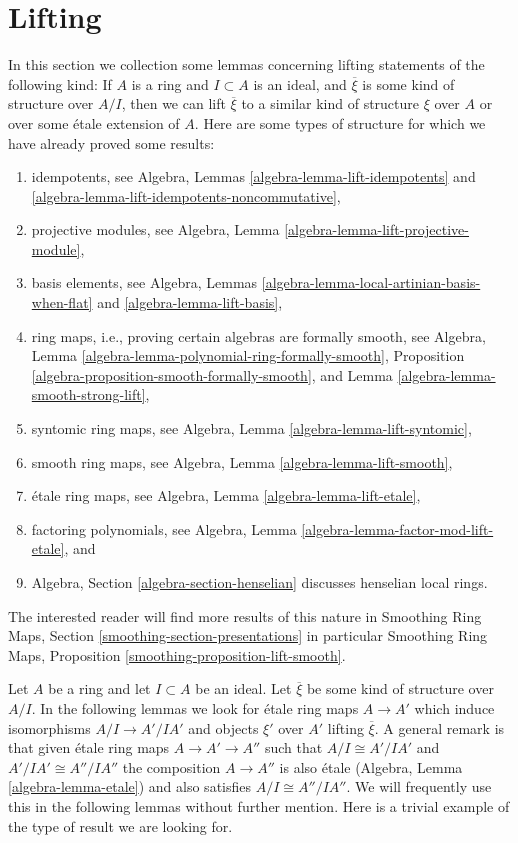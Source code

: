 \section{Lifting}
\label{section-lifting}

\noindent
In this section we collection some lemmas concerning lifting
statements of the following kind: If $A$ is a ring and $I \subset A$
is an ideal, and $\overline{\xi}$ is some kind of structure over
$A/I$, then we can lift $\overline{\xi}$ to a similar kind of structure
$\xi$ over $A$ or over some \'etale extension of $A$. Here are some types
of structure for which we have already proved some results:
\begin{enumerate}
\item idempotents, see
Algebra, Lemmas \ref{algebra-lemma-lift-idempotents} and
\ref{algebra-lemma-lift-idempotents-noncommutative},
\item projective modules, see
Algebra, Lemma \ref{algebra-lemma-lift-projective-module},
\item basis elements, see
Algebra, Lemmas \ref{algebra-lemma-local-artinian-basis-when-flat} and
\ref{algebra-lemma-lift-basis},
\item ring maps, i.e., proving certain algebras are formally smooth, see
Algebra, Lemma \ref{algebra-lemma-polynomial-ring-formally-smooth},
Proposition \ref{algebra-proposition-smooth-formally-smooth}, and
Lemma \ref{algebra-lemma-smooth-strong-lift},
\item syntomic ring maps, see
Algebra, Lemma \ref{algebra-lemma-lift-syntomic},
\item smooth ring maps, see
Algebra, Lemma \ref{algebra-lemma-lift-smooth},
\item \'etale ring maps, see
Algebra, Lemma \ref{algebra-lemma-lift-etale},
\item factoring polynomials, see
Algebra, Lemma \ref{algebra-lemma-factor-mod-lift-etale}, and
\item Algebra, Section \ref{algebra-section-henselian} discusses henselian
local rings.
\end{enumerate}
The interested reader will find more results of this nature in
Smoothing Ring Maps, Section \ref{smoothing-section-presentations}
in particular
Smoothing Ring Maps, Proposition \ref{smoothing-proposition-lift-smooth}.

\medskip\noindent
Let $A$ be a ring and let $I \subset A$ be an ideal. Let $\overline{\xi}$
be some kind of structure over $A/I$. In the following lemmas we look for
\'etale ring maps $A \to A'$ which induce isomorphisms $A/I \to A'/IA'$
and objects $\xi'$ over $A'$ lifting $\overline{\xi}$. A general remark is
that given \'etale ring maps $A \to A' \to A''$ such that
$A/I \cong A'/IA'$ and $A'/IA' \cong A''/IA''$ the composition
$A \to A''$ is also \'etale (Algebra, Lemma \ref{algebra-lemma-etale})
and also satisfies $A/I \cong A''/IA''$.
We will frequently use this in the following lemmas without further mention.
Here is a trivial example of the type of result we are looking for.

